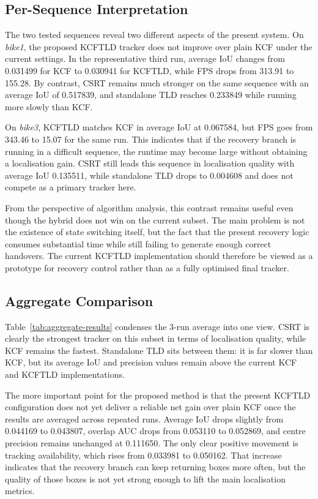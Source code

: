 \documentclass[12pt,a4paper]{article}
\begin{document}
\subsection{Per-Sequence Interpretation}
The two tested sequences reveal two different aspects of the present system. On \emph{bike1}, the proposed KCF\textendash TLD tracker does not improve over plain KCF under the current settings. In the representative third run, average IoU changes from 0.031499 for KCF to 0.030941 for KCF\textendash TLD, while FPS drops from 313.91 to 155.28. By contrast, CSRT remains much stronger on the same sequence with an average IoU of 0.517839, and standalone TLD reaches 0.233849 while running more slowly than KCF.

On \emph{bike3}, KCF\textendash TLD matches KCF in average IoU at 0.067584, but FPS goes from 343.46 to 15.07 for the same run. This indicates that if the recovery branch is running in a difficult sequence, the runtime may become large without obtaining a localisation gain. CSRT still leads this sequence in localisation quality with average IoU 0.135511, while standalone TLD drops to 0.004608 and does not compete as a primary tracker here.

From the perspective of algorithm analysis, this contrast remains useful even though the hybrid does not win on the current subset. The main problem is not the existence of state switching itself, but the fact that the present recovery logic consumes substantial time while still failing to generate enough correct handovers. The current KCF\textendash TLD implementation should therefore be viewed as a prototype for recovery control rather than as a fully optimised final tracker.

\subsection{Aggregate Comparison}
Table~\ref{tab:aggregate-results} condenses the 3-run average into one view. CSRT is clearly the strongest tracker on this subset in terms of localisation quality, while KCF remains the fastest. Standalone TLD sits between them: it is far slower than KCF, but its average IoU and precision values remain above the current KCF and KCF\textendash TLD implementations.

The more important point for the proposed method is that the present KCF\textendash TLD configuration does not yet deliver a reliable net gain over plain KCF once the results are averaged across repeated runs. Average IoU drops slightly from 0.044169 to 0.043807, overlap AUC drops from 0.053110 to 0.052869, and centre precision remains unchanged at 0.111650. The only clear positive movement is tracking availability, which rises from 0.033981 to 0.050162. That increase indicates that the recovery branch can keep returning boxes more often, but the quality of those boxes is not yet strong enough to lift the main localisation metrics.
\end{document}
